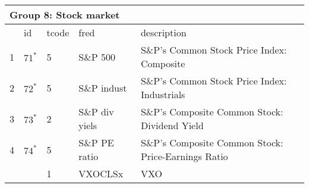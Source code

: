 \begin{table}[ht] 
\centering 
\begin{tabular}{lllll}
\multicolumn{5}{l}{Group 8: Stock market} \\
\toprule
 & id & tcode & fred & description \\
\midrule
1 & $71^*$ & 5 & S\&P 500 & S\&P's Common Stock Price Index: Composite \\
2 & $72^*$ & 5 & S\&P indust & S\&P's Common Stock Price Index: Industrials \\
3 & $73^*$ & 2 & S\&P div yiels & S\&P's Composite Common Stock: Dividend Yield \\
4 & $74^*$ & 5 & S\&P PE ratio & S\&P's Composite Common Stock: Price-Earnings Ratio \\
\rowcolor{lightgray} & & 1 & VXOCLSx & VXO \\
\bottomrule
\end{tabular}  
\end{table} 